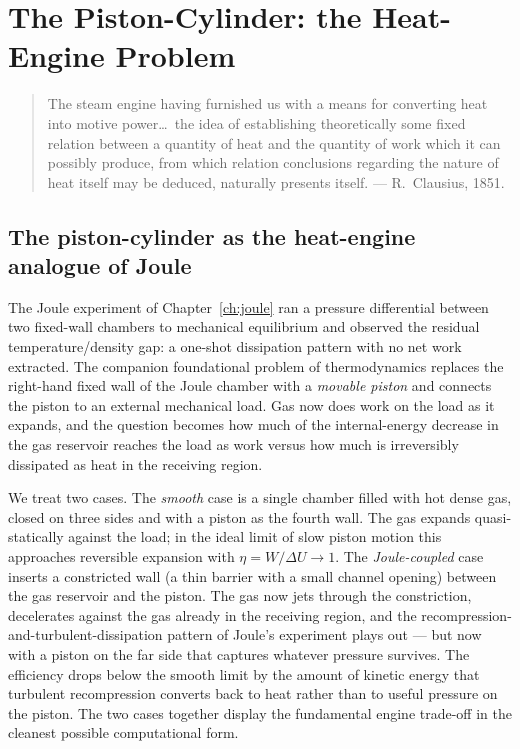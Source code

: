 \chapter{The Piston-Cylinder: the Heat-Engine Problem}\label{ch:piston}

\small
\begin{quote}
The steam engine having furnished us with a means for converting heat
into motive power\ldots\ the idea of establishing theoretically some
fixed relation between a quantity of heat and the quantity of work
which it can possibly produce, from which relation conclusions
regarding the nature of heat itself may be deduced, naturally
presents itself.
\normalfont\hfill --- R.~Clausius, 1851.
\end{quote}
\normalsize

\section{The piston-cylinder as the heat-engine analogue of Joule}

The Joule experiment of Chapter~\ref{ch:joule} ran a pressure differential
between two fixed-wall chambers to mechanical equilibrium and observed
the residual temperature/density gap: a one-shot dissipation pattern with
no net work extracted. The companion foundational problem of
thermodynamics replaces the right-hand fixed wall of the Joule chamber
with a \emph{movable piston} and connects the piston to an external
mechanical load. Gas now does work on the load as it expands, and the
question becomes how much of the internal-energy decrease in the
gas reservoir reaches the load as work versus how much is irreversibly
dissipated as heat in the receiving region.

We treat two cases. The \emph{smooth} case is a single chamber filled
with hot dense gas, closed on three sides and with a piston as the
fourth wall. The gas expands quasi-statically against the load; in the
ideal limit of slow piston motion this approaches reversible expansion
with $\eta = W/\Delta U \to 1$. The \emph{Joule-coupled} case inserts a
constricted wall (a thin barrier with a small channel opening) between
the gas reservoir and the piston. The gas now jets through the
constriction, decelerates against the gas already in the receiving
region, and the recompression-and-turbulent-dissipation pattern of
Joule's experiment plays out --- but now with a piston on the far side
that captures whatever pressure survives. The efficiency drops below
the smooth limit by the amount of kinetic energy that turbulent
recompression converts back to heat rather than to useful pressure on
the piston. The two cases together display the fundamental engine
trade-off in the cleanest possible computational form.

